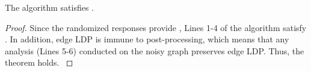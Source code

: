 \begin{theorem}
{\color{black}
    The \naive algorithm satisfies \epldp. }
\end{theorem}
\begin{proof}
{\color{black}
    Since the randomized responses provide \epldp \cite{imola2021locally, imola2022differentially}, 
    Lines 1-4 of the algorithm satisfy \epldp. 
    In addition, edge LDP is immune to post-processing, which means that any analysis (Lines 5-6) conducted on the noisy graph preserves edge LDP. 
    Thus, the theorem holds. 
}
\end{proof}